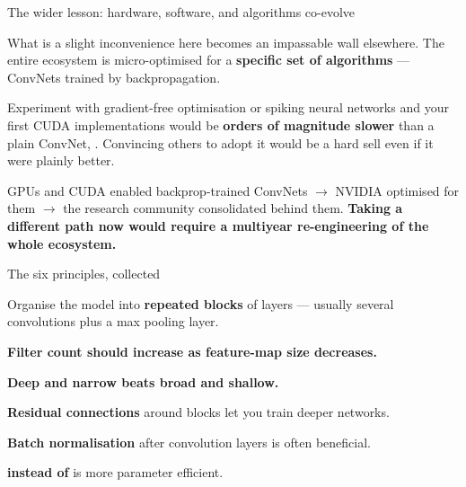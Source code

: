 \documentclass[aspectratio=169,11pt,t]{beamer}
\begin{document}
\begin{frame}[shrink=25]{The wider lesson: hardware, software, and algorithms co-evolve}
{\fontsize{9.4}{12.6}\selectfont\color{fg2}What is a slight inconvenience here becomes an impassable wall elsewhere. The entire ecosystem is micro-optimised for a \textbf{specific set of algorithms} --- ConvNets trained by backpropagation.\par}\vskip 4pt
\begin{iband}[rose]
Experiment with gradient-free optimisation or spiking neural networks and your first CUDA implementations would be \textbf{orders of magnitude slower} than a plain ConvNet, . Convincing others to adopt it would be a hard sell even if it were plainly better.
\end{iband}
{\fontsize{9.4}{12.6}\selectfont\color{fg2}GPUs and CUDA enabled backprop-trained ConvNets $\rightarrow$ NVIDIA optimised for them $\rightarrow$ the research community consolidated behind them. \textbf{Taking a different path now would require a multiyear re-engineering of the whole ecosystem.}\par}\vskip 4pt
\end{frame}


\begin{frame}[shrink=25]{The six principles, collected}
\begin{isteps}
\item Organise the model into \textbf{repeated blocks} of layers --- usually several convolutions plus a max pooling layer.
\item \textbf{Filter count should increase as feature-map size decreases.}
\item \textbf{Deep and narrow beats broad and shallow.}
\item \textbf{Residual connections} around blocks let you train deeper networks.
\item \textbf{Batch normalisation} after convolution layers is often beneficial.
\item \textbf{ instead of } is more parameter efficient.
\end{isteps}
\end{frame}
\end{document}
